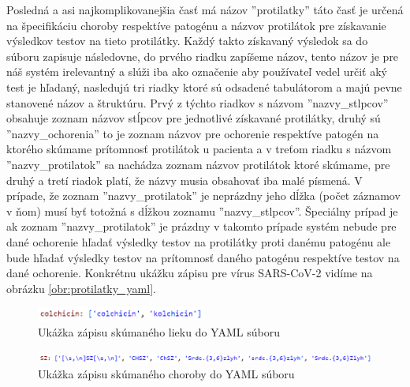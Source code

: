 Posledná a asi najkomplikovanejšia časť má názov ''protilatky'' táto časť je určená na špecifikáciu choroby respektíve patogénu a názvov protilátok pre získavanie výsledkov testov na tieto protilátky. Každý takto získavaný výsledok sa do súboru zapisuje následovne, do prvého riadku zapíšeme názov, tento názov je pre náš systém irelevantný a slúži iba ako označenie aby používateľ vedel určiť aký test je hľadaný, nasledujú tri riadky ktoré sú odsadené tabulátorom a majú pevne stanovené názov a štruktúru. Prvý z týchto riadkov s názvom ''nazvy\_stlpcov'' obsahuje zoznam názvov stĺpcov pre jednotlivé získavané protilátky, druhý sú ''nazvy\_ochorenia'' to je zoznam názvov pre ochorenie respektíve patogén na ktorého skúmame prítomnosť protilátok u pacienta a v treťom riadku s názvom ''nazvy\_protilatok'' sa nachádza zoznam názvov protilátok ktoré skúmame, pre druhý a tretí riadok platí, že názvy musia obsahovať iba malé písmená. V prípade, že zoznam ''nazvy\_protilatok'' je neprázdny jeho dĺžka (počet záznamov v ňom) musí byť totožná s dĺžkou zoznamu ''nazvy\_stlpcov''. Špeciálny prípad je ak zoznam ''nazvy\_protilatok'' je prázdny v takomto prípade systém nebude pre dané ochorenie hľadať výsledky testov na protilátky proti danému patogénu ale bude hľadať výsledky testov na prítomnosť daného patogénu respektíve testov na dané ochorenie. Konkrétnu ukážku zápisu pre vírus SARS-CoV-2 vidíme na obrázku \ref{obr:protilatky_yaml}.

\begin{figure}
	\centerline{\includegraphics[width=0.5\textwidth]{images/lieky_yaml}}
	\caption[Ukážka zápisu lieku]{Ukážka zápisu skúmaného lieku do YAML súboru}
	\label{obr:lieky_yaml}
\end{figure}

\begin{figure}
	\centerline{\includegraphics[width=1.05\textwidth]{images/choroby_yaml}}
	\caption[Ukážka zápisu choroby]{Ukážka zápisu skúmaného choroby do YAML súboru}
	\label{obr:choroby_yaml}
\end{figure}
  
